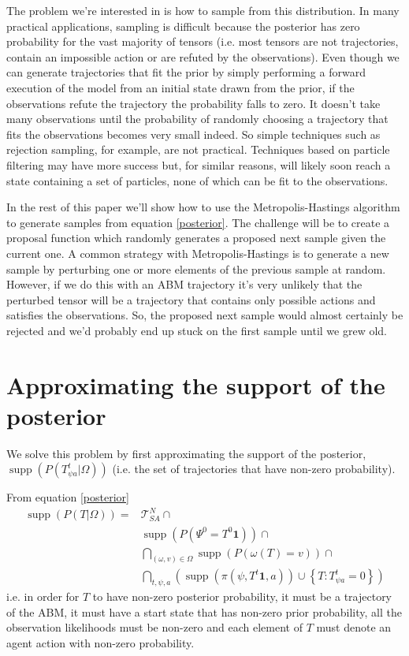 \documentclass{article}
\DeclareMathOperator\supp{supp}
\begin{document}
The problem we're interested in is how to sample from this distribution. In many practical applications, sampling is difficult because the posterior has zero probability for the vast majority of tensors (i.e. most tensors are not trajectories, contain an impossible action or are refuted by the observations). Even though we can generate trajectories that fit the prior by simply performing a forward execution of the model from an initial state drawn from the prior, if the observations refute the trajectory the probability falls to zero. It doesn't take many observations until the probability of randomly choosing a trajectory that fits the observations becomes very small indeed. So simple techniques such as rejection sampling, for example, are not practical. Techniques based on particle filtering may have more success but, for similar reasons, will likely soon reach a state containing a set of particles, none of which can be fit to the observations.

In the rest of this paper we'll show how to use the Metropolis-Hastings algorithm to generate samples from equation \eqref{posterior}. The challenge will be to create a proposal function which randomly generates a proposed next sample given the current one. A common strategy with Metropolis-Hastings is to generate a new sample by perturbing one or more elements of the previous sample at random. However, if we do this with an ABM trajectory it's very unlikely that the perturbed tensor will be a trajectory that contains only possible actions and satisfies the observations. So, the proposed next sample would almost certainly be rejected and we'd probably end up stuck on the first sample until we grew old.

\section{Approximating the support of the posterior}

We solve this problem by first approximating the support of the posterior, $\supp(P(T^t_{\psi a}|\Omega))$ (i.e. the set of trajectories that have non-zero probability).

From equation \eqref{posterior}
\begin{equation}
\begin{aligned}
\supp (P( T |\Omega)) = & \mathcal{T}^N_{SA} \cap \\ 
&\supp(P(\Psi^0 = T^0\mathbf{1})) \cap \\
&\bigcap_{(\omega,v) \in \Omega}  \supp\left(P\left(\omega(T)=v\right)\right) \cap \\
&\bigcap_{t, \psi, a} \left( \supp\left(\pi(\psi,T^t\mathbf{1},a)\right) \cup \left\{T:T^t_{\psi a} = 0\right\} \right)
\end{aligned}
\label{support}
\end{equation}
i.e. in order for $T$ to have non-zero posterior probability, it must be a trajectory of the ABM, it must have a start state that has non-zero prior probability, all the observation likelihoods must be non-zero and each element of $T$ must denote an agent action with non-zero probability.
\end{document}
